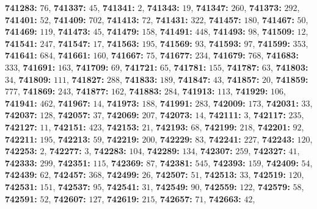 \textsf{\bfseries 741283:} $76$, \textsf{\bfseries 741337:} $45$, \textsf{\bfseries 741341:} $2$, \textsf{\bfseries 741343:} $19$, \textsf{\bfseries 741347:} $260$, \textsf{\bfseries 741373:} $292$, \textsf{\bfseries 741401:} $52$, \textsf{\bfseries 741409:} $702$, \textsf{\bfseries 741413:} $72$, \textsf{\bfseries 741431:} $322$, \textsf{\bfseries 741457:} $180$, \textsf{\bfseries 741467:} $50$, \textsf{\bfseries 741469:} $119$, \textsf{\bfseries 741473:} $45$, \textsf{\bfseries 741479:} $158$, \textsf{\bfseries 741491:} $448$, \textsf{\bfseries 741493:} $98$, \textsf{\bfseries 741509:} $12$, \textsf{\bfseries 741541:} $247$, \textsf{\bfseries 741547:} $17$, \textsf{\bfseries 741563:} $195$, \textsf{\bfseries 741569:} $93$, \textsf{\bfseries 741593:} $97$, \textsf{\bfseries 741599:} $353$, \textsf{\bfseries 741641:} $684$, \textsf{\bfseries 741661:} $160$, \textsf{\bfseries 741667:} $75$, \textsf{\bfseries 741677:} $234$, \textsf{\bfseries 741679:} $768$, \textsf{\bfseries 741683:} $333$, \textsf{\bfseries 741691:} $163$, \textsf{\bfseries 741709:} $69$, \textsf{\bfseries 741721:} $65$, \textsf{\bfseries 741781:} $155$, \textsf{\bfseries 741787:} $63$, \textsf{\bfseries 741803:} $34$, \textsf{\bfseries 741809:} $111$, \textsf{\bfseries 741827:} $288$, \textsf{\bfseries 741833:} $189$, \textsf{\bfseries 741847:} $43$, \textsf{\bfseries 741857:} $20$, \textsf{\bfseries 741859:} $777$, \textsf{\bfseries 741869:} $243$, \textsf{\bfseries 741877:} $162$, \textsf{\bfseries 741883:} $284$, \textsf{\bfseries 741913:} $113$, \textsf{\bfseries 741929:} $106$, \textsf{\bfseries 741941:} $462$, \textsf{\bfseries 741967:} $14$, \textsf{\bfseries 741973:} $188$, \textsf{\bfseries 741991:} $283$, \textsf{\bfseries 742009:} $173$, \textsf{\bfseries 742031:} $33$, \textsf{\bfseries 742037:} $128$, \textsf{\bfseries 742057:} $37$, \textsf{\bfseries 742069:} $207$, \textsf{\bfseries 742073:} $14$, \textsf{\bfseries 742111:} $3$, \textsf{\bfseries 742117:} $235$, \textsf{\bfseries 742127:} $11$, \textsf{\bfseries 742151:} $423$, \textsf{\bfseries 742153:} $21$, \textsf{\bfseries 742193:} $68$, \textsf{\bfseries 742199:} $218$, \textsf{\bfseries 742201:} $92$, \textsf{\bfseries 742211:} $195$, \textsf{\bfseries 742213:} $59$, \textsf{\bfseries 742219:} $200$, \textsf{\bfseries 742229:} $83$, \textsf{\bfseries 742241:} $227$, \textsf{\bfseries 742243:} $120$, \textsf{\bfseries 742253:} $2$, \textsf{\bfseries 742277:} $3$, \textsf{\bfseries 742283:} $104$, \textsf{\bfseries 742289:} $134$, \textsf{\bfseries 742307:} $259$, \textsf{\bfseries 742327:} $41$, \textsf{\bfseries 742333:} $299$, \textsf{\bfseries 742351:} $115$, \textsf{\bfseries 742369:} $87$, \textsf{\bfseries 742381:} $545$, \textsf{\bfseries 742393:} $159$, \textsf{\bfseries 742409:} $54$, \textsf{\bfseries 742439:} $62$, \textsf{\bfseries 742457:} $368$, \textsf{\bfseries 742499:} $26$, \textsf{\bfseries 742507:} $51$, \textsf{\bfseries 742513:} $33$, \textsf{\bfseries 742519:} $120$, \textsf{\bfseries 742531:} $151$, \textsf{\bfseries 742537:} $95$, \textsf{\bfseries 742541:} $31$, \textsf{\bfseries 742549:} $90$, \textsf{\bfseries 742559:} $122$, \textsf{\bfseries 742579:} $58$, \textsf{\bfseries 742591:} $52$, \textsf{\bfseries 742607:} $127$, \textsf{\bfseries 742619:} $215$, \textsf{\bfseries 742657:} $71$, \textsf{\bfseries 742663:} $42$, 
